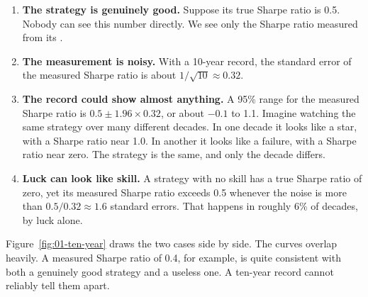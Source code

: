 \begin{enumerate}
  \item \textbf{The strategy is genuinely good.} Suppose its true Sharpe ratio is 0.5. Nobody can see this number directly. We see only the Sharpe ratio measured from its .
  \item \textbf{The measurement is noisy.} With a 10-year record, the standard error of the measured Sharpe ratio is about $1/\sqrt{10} \approx 0.32$.
  \item \textbf{The record could show almost anything.} A 95\% range for the measured Sharpe ratio is $0.5 \pm 1.96 \times 0.32$, or about $-0.1$ to 1.1. Imagine watching the same strategy over many different decades. In one decade it looks like a star, with a Sharpe ratio near 1.0. In another it looks like a failure, with a Sharpe ratio near zero. The strategy is the same, and only the decade differs.
  \item \textbf{Luck can look like skill.} A strategy with no skill has a true Sharpe ratio of zero, yet its measured Sharpe ratio exceeds 0.5 whenever the noise is more than $0.5/0.32 \approx 1.6$ standard errors. That happens in roughly 6\% of decades, by luck alone.
\end{enumerate}

Figure~\ref{fig:01-ten-year} draws the two cases side by side. The curves overlap heavily. A measured Sharpe ratio of 0.4, for example, is quite consistent with both a genuinely good strategy and a useless one. A ten-year record cannot reliably tell them apart.


